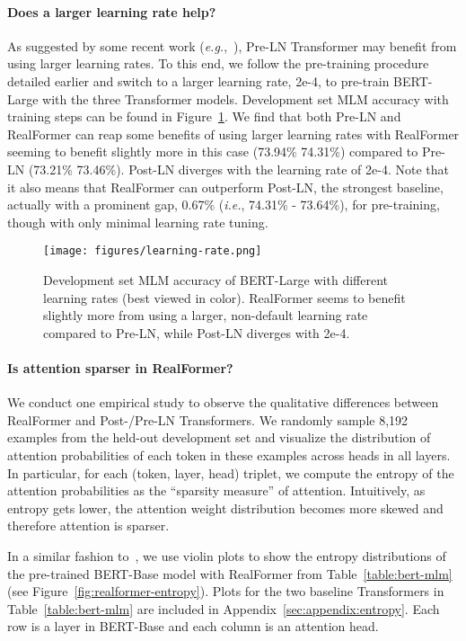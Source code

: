 \documentclass[11pt,a4paper]{article}
\begin{document}
\paragraph{Does a larger learning rate help?}
As suggested by some recent work (\emph{e.g.},~\citet{Xiong-2020-preln}), Pre-LN Transformer may benefit from using larger learning rates. To this end, we follow the pre-training procedure detailed earlier and switch to a larger learning rate, 2e-4, to pre-train BERT-Large with the three Transformer models. Development set MLM accuracy with training steps can be found in Figure~\ref{fig:lr}. We find that both Pre-LN and RealFormer can reap some benefits of using larger learning rates with RealFormer seeming to benefit slightly more in this case (73.94\%  74.31\%) compared to Pre-LN (73.21\%  73.46\%). Post-LN diverges with the learning rate of 2e-4.
Note that it also means that RealFormer can outperform Post-LN, the strongest baseline, actually with a prominent gap, 0.67\% (\emph{i.e.}, 74.31\% - 73.64\%), for pre-training, though with only minimal learning rate tuning.

\begin{figure}
\centering
\texttt{[image: figures/learning-rate.png]}
\caption{Development set MLM accuracy of BERT-Large with different learning rates (best viewed in color). RealFormer seems to benefit slightly more from using a larger, non-default learning rate compared to Pre-LN, while Post-LN diverges with 2e-4.}
\label{fig:lr}
\end{figure}



\paragraph{Is attention sparser in RealFormer?}
We conduct one empirical study to observe the qualitative differences between RealFormer and Post-/Pre-LN Transformers. 
We randomly sample 8,192 examples from the held-out development set and visualize the distribution of attention probabilities of each token in these examples across heads in all layers.
In particular, for each (token, layer, head) triplet, we compute the entropy of the attention probabilities as the ``sparsity measure'' of attention. Intuitively, as entropy gets lower, the attention weight distribution becomes more skewed and therefore attention is sparser.

In a similar fashion to~\citet{Ramsauer-2020-hopfield}, we use violin plots to show the entropy distributions of the pre-trained BERT-Base model with RealFormer from Table~\ref{table:bert-mlm} (see Figure~\ref{fig:realformer-entropy}).
Plots for the two baseline Transformers in Table~\ref{table:bert-mlm} are included in Appendix~\ref{sec:appendix:entropy}.
Each row is a layer in BERT-Base and each column is an attention head.
\end{document}
